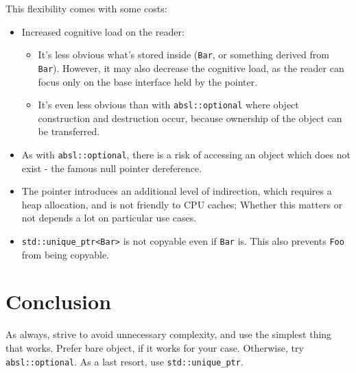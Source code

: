 This flexibility comes with some costs:
\begin{itemize}
    \item Increased cognitive load on the reader:
    \begin{itemize}
        \item It’s less obvious what’s stored inside (\texttt{Bar}, or something derived from \texttt{Bar}). However, it may also decrease the cognitive load, as the reader can focus only on the base interface held by the pointer.
        \item It’s even less obvious than with \texttt{absl::optional} where object construction and destruction occur, because ownership of the object can be transferred.
    \end{itemize}
    \item As with \texttt{absl::optional}, there is a risk of accessing an object which does not exist - the famous null pointer dereference.
    \item The pointer introduces an additional level of indirection, which requires a heap allocation, and is not friendly to CPU caches; Whether this matters or not depends a lot on particular use cases.
    \item \texttt{std::unique_ptr<Bar>} is not copyable even if \texttt{Bar} is. This also prevents \texttt{Foo} from being copyable.
\end{itemize}

\section{Conclusion}
As always, strive to avoid unnecessary complexity, and use the simplest thing that works. Prefer bare object, if it works for your case. Otherwise, try \texttt{absl::optional}. As a last resort, use \texttt{std::unique_ptr}.

